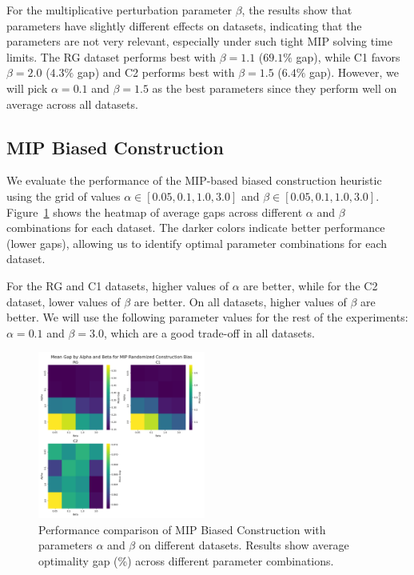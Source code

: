 \documentclass[twocolumn, switch]{article} %
\begin{document}
For the multiplicative perturbation parameter $\beta$, the results show that parameters have slightly different effects on datasets, indicating that the parameters are not very relevant, especially under such tight MIP solving time limits. The RG dataset performs best with $\beta = 1.1$ ($69.1\%$ gap), while C1 favors $\beta = 2.0$ ($4.3\%$ gap) and C2 performs best with $\beta = 1.5$ ($6.4\%$ gap). However, we will pick $\alpha = 0.1$ and $\beta = 1.5$ as the best parameters since they perform well on average across all datasets.


\subsection{MIP Biased Construction}

We evaluate the performance of the MIP-based biased construction heuristic
using the grid of values $\alpha \in [0.05, 0.1, 1.0, 3.0]$ and $\beta \in [0.05, 0.1, 1.0, 3.0]$.
Figure~\ref{fig:alpha_beta_grid_mip_randomized_construction_bias} shows the heatmap of average gaps across different $\alpha$ and $\beta$ combinations for each dataset.
The darker colors indicate better performance (lower gaps), allowing us to identify optimal parameter combinations for each dataset. 

For the RG and C1 datasets, higher values of $\alpha$ are better, while for the C2 dataset, lower values of $\beta$ are better. On all datasets, higher values of $\beta$ are better.
We will use the following parameter values for the rest of the experiments: $\alpha = 0.1$ and $\beta = 3.0$, which are a good trade-off in all datasets.

\begin{figure}[h]
    \centering
    \includegraphics[width=0.49\textwidth]{figures/alpha_beta_grid_mip_randomized_construction_bias.png}
    \caption{Performance comparison of MIP Biased Construction with parameters $\alpha$ and $\beta$ on different datasets. Results show average optimality gap (\%) across different parameter combinations.}
    \label{fig:alpha_beta_grid_mip_randomized_construction_bias} 
\end{figure} 
\end{document}

